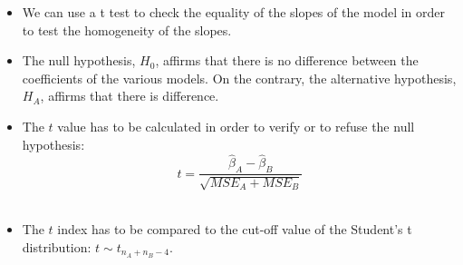 \begin{frame}
  \vspace*{0.25cm}
  \begin{itemize}
    \item We can use a t test to check the equality of the slopes of the model in order to test the homogeneity of the slopes.
    \vspace{0.2cm}
    \item The null hypothesis, $ H_0 $, affirms that there is no difference between the coefficients of the various models. On the contrary, the alternative hypothesis, $ H_A $, affirms that there is difference.
    \vspace{0.2cm}
    \item The $ t $ value has to be calculated in order to verify or to refuse the null hypothesis:
      $$ t = \frac{\hat{\beta}_A - \hat{\beta}_B}{\sqrt{MSE_A + MSE_B}} $$\\
    \vspace{0.2cm}
    \item The $ t $ index has to be compared to the cut-off value of the Student's t distribution: $ t \sim t_{n_A+n_B-4} $.
  \end{itemize}
\end{frame}


